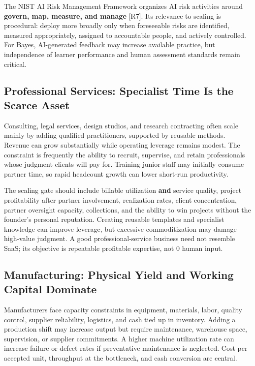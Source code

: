 The NIST AI Risk Management Framework organizes AI risk activities around \textbf{govern, map, measure, and manage} [R7]. Its relevance to scaling is procedural: deploy more broadly only when foreseeable risks are identified, measured appropriately, assigned to accountable people, and actively controlled. For Bayes, AI-generated feedback may increase available practice, but independence of learner performance and human assessment standards remain critical.

\subsection{Professional Services: Specialist Time Is the Scarce Asset}
\label{sec:professional_services_specialist_time}

Consulting, legal services, design studios, and research contracting often scale mainly by adding qualified practitioners, supported by reusable methods. Revenue can grow substantially while operating leverage remains modest. The constraint is frequently the ability to recruit, supervise, and retain professionals whose judgment clients will pay for. Training junior staff may initially consume partner time, so rapid headcount growth can lower short-run productivity.

The scaling gate should include billable utilization \textbf{and} service quality, project profitability after partner involvement, realization rates, client concentration, partner oversight capacity, collections, and the ability to win projects without the founder's personal reputation. Creating reusable templates and specialist knowledge can improve leverage, but excessive commoditization may damage high-value judgment. A good professional-service business need not resemble SaaS; its objective is repeatable profitable expertise, not 0 human input.

\subsection{Manufacturing: Physical Yield and Working Capital Dominate}
\label{sec:manufacturing_yield_working_capital}

Manufacturers face capacity constraints in equipment, materials, labor, quality control, supplier reliability, logistics, and cash tied up in inventory. Adding a production shift may increase output but require maintenance, warehouse space, supervision, or supplier commitments. A higher machine utilization rate can increase failure or defect rates if preventative maintenance is neglected. Cost per accepted unit, throughput at the bottleneck, and cash conversion are central.

